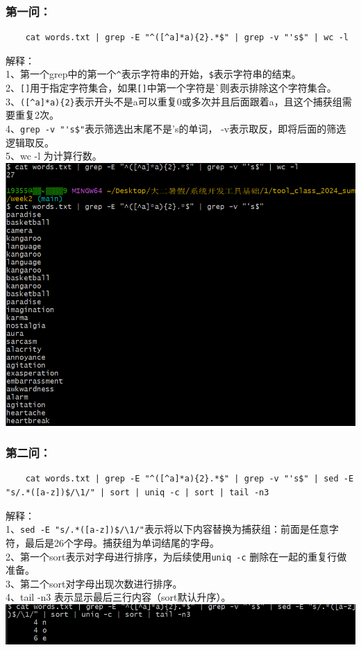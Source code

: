 \documentclass[UTF8,a4paper]{ctexart}
\begin{document}
\subsubsection{第一问：}
\begin{lstlisting}
    cat words.txt | grep -E "^([^a]*a){2}.*$" | grep -v "'s$" | wc -l
\end{lstlisting}
解释：\\
1、第一个grep中的第一个\verb|^|表示字符串的开始，\verb|$|表示字符串的结束。\\
2、\verb|[]|用于指定字符集合，如果\verb|[]|中第一个字符是\verb|`|则表示排除这个字符集合。\\
3、\verb|([^a]*a){2}|表示开头不是a可以重复0或多次并且后面跟着a，且这个捕获组需要重复2次。\\
4、\verb|grep -v "'s$"|表示筛选出末尾不是's的单词， -v表示取反，即将后面的筛选逻辑取反。\\
5、wc -l 为计算行数。\\
\includegraphics[width=1\textwidth]{./pictures/5-1.png}
\subsubsection{第二问：}
\begin{lstlisting}
    cat words.txt | grep -E "^([^a]*a){2}.*$" | grep -v "'s$" | sed -E "s/.*([a-z])$/\1/" | sort | uniq -c | sort | tail -n3
\end{lstlisting}
解释：\\
1、\verb|sed -E "s/.*([a-z])$/\1/"|表示将以下内容替换为捕获组：前面是任意字符，最后是26个字母。捕获组为单词结尾的字母。\\
2、第一个sort表示对字母进行排序，为后续使用\verb |uniq -c| 删除在一起的重复行做准备。\\
3、第二个sort对字母出现次数进行排序。\\
4、tail -n3 表示显示最后三行内容（sort默认升序）。\\
\includegraphics[width=1\textwidth]{./pictures/5-2.png}
\end{document}
